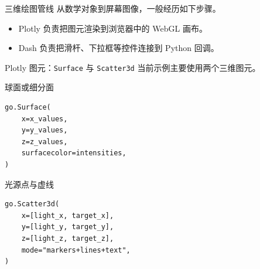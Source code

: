 \documentclass[aspectratio=169,11pt]{ctexbeamer}
\begin{document}
\begin{frame}{三维绘图管线}
  从数学对象到屏幕图像，一般经历如下步骤。

  \begin{center}
  \end{center}

  \begin{itemize}
    \item Plotly 负责把图元渲染到浏览器中的 WebGL 画布。
    \item Dash 负责把滑杆、下拉框等控件连接到 Python 回调。
  \end{itemize}
\end{frame}

\begin{frame}[fragile]{Plotly 图元：\texttt{Surface} 与 \texttt{Scatter3d}}
  \footnotesize
  当前示例主要使用两个三维图元。

  \begin{block}{球面或细分面}
\begin{Verbatim}[fontsize=\scriptsize]
go.Surface(
    x=x_values,
    y=y_values,
    z=z_values,
    surfacecolor=intensities,
)
\end{Verbatim}
  \end{block}

  \begin{block}{光源点与虚线}
\begin{Verbatim}[fontsize=\scriptsize]
go.Scatter3d(
    x=[light_x, target_x],
    y=[light_y, target_y],
    z=[light_z, target_z],
    mode="markers+lines+text",
)
\end{Verbatim}
  \end{block}
\end{frame}
\end{document}
